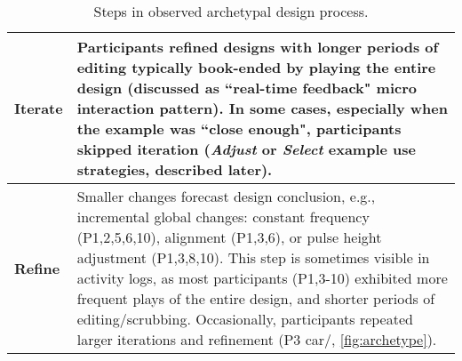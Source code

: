 \begin{table*}[]
\begin{tabular}{p{0.5in}p{4in}}
    	    \textbf{Iterate} & 
                Participants refined designs with longer periods of editing typically book-ended by playing the entire design (discussed as ``real-time feedback"  micro interaction pattern).
            	In some cases, especially when the example was ``close enough", participants skipped iteration (\emph{Adjust} or \emph{Select} example use strategies, described later).
             \\
    	    \midrule
    	    
    	    \textbf{Refine} & 
                Smaller changes forecast design conclusion, e.g.,
            	incremental global changes: constant frequency (P1,2,5,6,10), alignment (P1,3,6), or pulse height adjustment (P1,3,8,10).
            	This step is sometimes visible in activity logs, as most participants (P1,3-10) exhibited more frequent plays of the entire design, and shorter periods of editing/scrubbing.
            	Occasionally, participants repeated larger iterations and refinement (P3 car/\hi, \autoref{fig:archetype}).
             \\
            \end{tabular}
            \caption{Steps in observed archetypal design process.
            }
            \label{tab:archetypal:process}
        \end{table*}
        
        
%
%
